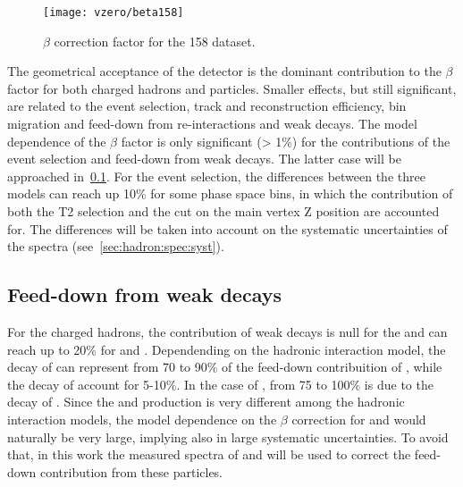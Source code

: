 \begin{figure}
  \centering
  \texttt{[image: vzero/beta158]}
  
  \caption{$\beta$ correction factor for the 158 \GeVc dataset.}
  \label{fig:hadron:correction:beta:vzero158}
\end{figure}

The geometrical acceptance of the detector
is the dominant contribution to the $\beta$ factor
for both charged hadrons and \vzero particles.
Smaller effects, but still significant, are related
to the event selection, track and \vzero reconstruction efficiency, 
bin migration and feed-down from re-interactions and weak decays.
The model dependence of the $\beta$ factor is only significant (> 1\%) for the
contributions of the event selection and feed-down from weak decays.
The latter case will be approached in~\cref{sec:hadron:correction:fd}.
For the event selection, the differences between the three models
can reach up 10\% for some phase space bins, in which the contribution
of both the T2 selection and the cut on the main vertex Z position are accounted for.
The differences will be taken into account on the systematic uncertainties
of the spectra (see~\cref{sec:hadron:spec:syst}).


\subsection{Feed-down from weak decays}
\label{sec:hadron:correction:fd}



For the charged hadrons, the contribution of weak decays
is null for the \kaons and can reach up to 20\% for \pions and
\protons. Dependending on the hadronic interaction model,
the decay of \kzeros can represent from 70 to 90\% of the
feed-down contribuition of \pions, while the decay of \lambs account
for 5-10\%. In the case of \protons, from 75 to 100\% is due to the decay
of \lambs.
Since the \lambs and \kzeros production is very different
among the hadronic interaction models, the model dependence
on the $\beta$ correction for \pions and \protons would
naturally be very large, implying also in large
systematic uncertainties. To avoid that, in this work the
measured spectra of \lambs and \kzeros will be used
to correct the feed-down contribution from these particles.

